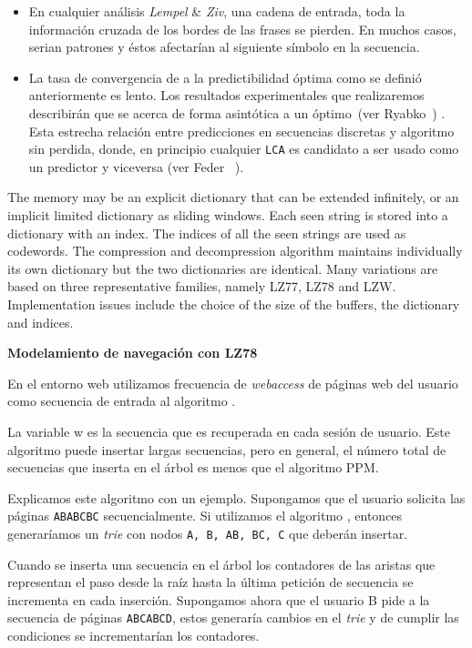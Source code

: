 \begin{itemize}
	\menorEspacioItemize	
	\item En cualquier análisis \emph{Lempel} \& \emph{Ziv}, una cadena de entrada, toda la información cruzada de los bordes de las frases se pierden. En muchos casos, serian patrones y éstos afectarían al siguiente símbolo en la secuencia.
	
	\item La tasa de convergencia de \lzSieteOcho a la predictibilidad óptima como se definió anteriormente es lento. Los resultados experimentales que realizaremos  describirán que \lzSieteOcho se acerca de forma asintótica a un óptimo~(ver Ryabko~\etal \cite{Ryabko2002}) . Esta estrecha relación entre predicciones en secuencias discretas y algoritmo sin perdida, donde, en principio cualquier \texttt{LCA} es candidato a ser usado como un predictor y viceversa (ver Feder \etal~\cite{Feder1992}). 
	
\end{itemize}



The memory may be an explicit dictionary that can be extended infinitely, or an implicit limited dictionary as sliding windows. Each seen string is stored into a dictionary with an index. The indices of all the seen strings are used as codewords. The compression and decompression algorithm maintains individually its own dictionary but the two dictionaries are identical. Many variations are based on three representative families, namely LZ77, LZ78 and LZW. Implementation issues include the choice of the size of the buffers, the dictionary and indices.






\textbf{Modelamiento de navegación con LZ78}

En el entorno web utilizamos frecuencia de \emph{webaccess} de páginas web del usuario como secuencia de entrada al algoritmo \lzSieteOcho. 

La variable w es la secuencia que es recuperada en cada sesión de usuario. Este algoritmo puede insertar largas secuencias, pero en general, el número total de secuencias que inserta en el árbol es menos que el algoritmo PPM. 

Explicamos este algoritmo con un ejemplo. Supongamos que el usuario solicita las páginas \texttt{ABABCBC} secuencialmente. Si utilizamos el algoritmo \lzSieteOcho, entonces generaríamos un \emph{trie} con nodos  \texttt{A, B, AB, BC, C} que deberán insertar. 


Cuando se inserta una secuencia en el árbol los contadores de las aristas que representan el paso desde la raíz hasta la última petición de secuencia se incrementa en cada inserción. Supongamos ahora que el usuario B pide a la secuencia de páginas \texttt{ABCABCD}, estos generaría cambios en el \emph{trie} y de cumplir las condiciones se incrementarían los contadores. 











